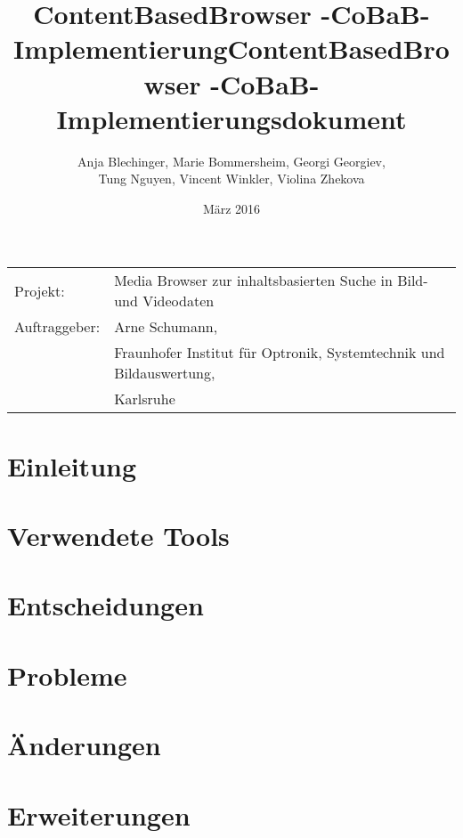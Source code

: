 \documentclass[parskip=full]{scrartcl}
\title{ContentBasedBrowser -CoBaB- \\ Implementierung}
\begin{document}
\begin{titlepage}
\title{ContentBasedBrowser -CoBaB- \\ Implementierungsdokument}
\author{Anja Blechinger, Marie Bommersheim, Georgi Georgiev,\\ Tung Nguyen, Vincent Winkler, Violina Zhekova}
\date{März 2016}
\maketitle
\vspace{300pt}
\begin{tabular}{l l}
Projekt: & Media Browser zur inhaltsbasierten Suche in Bild- und Videodaten\\
Auftraggeber: & Arne Schumann,\\
 & Fraunhofer Institut für Optronik, Systemtechnik und Bildauswertung,\\
 & Karlsruhe\\
\end{tabular}
\thispagestyle{empty}
\end{titlepage}
\setcounter{page}{1}

\tableofcontents
\pagebreak

\section{Einleitung}

\pagebreak

\section{Verwendete Tools}

\pagebreak

\section{Entscheidungen}

\pagebreak

\section{Probleme}

\pagebreak

\section{Änderungen}

\pagebreak

\section{Erweiterungen}

\pagebreak
\end{document}

